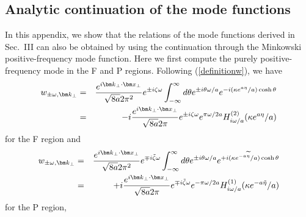 \documentclass[aps,prd,preprintnumbers,nofootinbib,showpacs]{revtex4}%
\begin{document}
\begin{widetext}
\section{Analytic continuation of the mode functions}
In this appendix, we show that the 
 relations of the mode functions derived in Sec.~III can also be obtained by using the continuation 
through the Minkowski positive-frequency mode function.  
Here we first compute the purely positive-frequency mode in the F and P regions. 
Following (\ref{definitionw}), 
we have 
\begin{eqnarray}
w_{\pm \omega,{\bm k}_\perp}&=&{e^{i{\bm k}_\perp\cdot{\bm x}_\perp}\over \sqrt{8a}2\pi^2} e^{\pm i\zeta\omega}
\int_{-\infty}^{\infty} d\theta e^{\pm i\theta\omega/a}
e^{-i(\kappa e^{a\eta}/a)\cosh\theta }
\nonumber\\
&=&-i{e^{i{\bm k}_\perp\cdot{\bm x}_\perp}\over \sqrt{8a}2\pi} e^{\pm i\zeta\omega}e^{\pi\omega/2a}
H_{i\omega/a}^{(2)}(\kappa e^{a\eta}/a)
\label{wF}
\end{eqnarray}
for the F region and 
\begin{eqnarray}
w_{\pm \omega,{\bm k}_\perp}&=&{e^{i{\bm k}_\perp\cdot{\bm x}_\perp}\over \sqrt{8a}2\pi^2} e^{\mp i\tilde\zeta\omega}
\int_{-\infty}^{\infty} d\theta e^{\pm i\theta\omega/a}
e^{+i (\kappa e^{-a\widetilde\eta}/a)\cosh\theta }
\nonumber\\
&=&+i{e^{i{\bm k}_\perp\cdot{\bm x}_\perp}\over \sqrt{8a}2\pi} e^{\mp i\tilde\zeta\omega}e^{-\pi\omega/2a}
H_{i\omega/a}^{(1)}(\kappa e^{-a\tilde\eta}/a)
\label{wP}
\end{eqnarray}
for the P region, 

\end{widetext}
\end{document}
